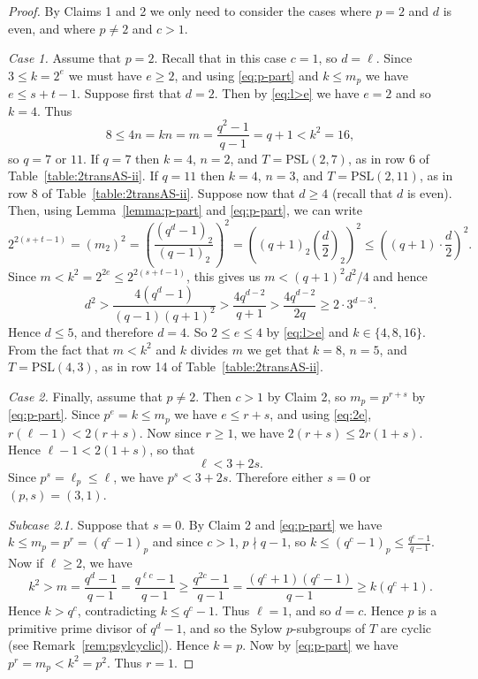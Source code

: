 \documentclass[12pt]{amsart}
\theoremstyle{remark}
\theoremstyle{definition}
\newcommand{\PSL}{\mathrm{PSL}}
\begin{document}
\begin{proof}
\smallskip
By Claims 1 and 2 we only need to consider the cases where $p = 2$ and $d$ is even, and where $p \neq 2$ and $c > 1$.

\emph{Case 1.}  Assume that $p = 2$. Recall that in this case $c = 1$, so $d = \ell$.
 Since $3 \leqslant k = 2^e$ we must have $e \geqslant 2$, and using \eqref{eq:p-part} and $k \leqslant m_p$ we have $e \leqslant s+t-1$.
Suppose first that $d = 2$. Then by \eqref{eq:l>e} we have $e=2$ and so  $k = 4$. Thus
	\[ 
	8 \leqslant 4n = kn = m = \frac{q^2-1}{q-1} = q+1 < k^2 = 16, 
	\]
so $q = 7$ or $11$. If $q = 7$ then $k = 4$, $n = 2$, and $T = \PSL(2,7)$, as in row 6 of Table~\ref{table:2transAS-ii}. If $q = 11$ then $k = 4$, $n = 3$, and $T = \PSL(2,11)$, as in row 8 of Table~\ref{table:2transAS-ii}.
Suppose now that $d \geqslant 4$ (recall that $d$ is even). Then, using Lemma~\ref{lemma:p-part} and \eqref{eq:p-part}, we can write
$$ 
2^{2(s+t-1)}  = (m_2)^2 = \left ( \frac{(q^d-1)_2}{(q-1)_2}\right) ^2 = \left((q+1)_2\left(\frac{d}{2}\right)_2\right)^2 \leqslant \left((q+1) \cdot \frac{d}{2}\right)^2. 
$$
Since $m < k^2 = 2^{2e} \leqslant 2^{2(s+t-1)}$, this gives us $m < (q+1)^2d^2/4$ and hence
	\[ 
	d^2> \frac{4(q^d-1)}{(q-1)(q+1)^2} > \frac{4q^{d-2}}{q+1} > \frac{4q^{d-2}}{2q} \geqslant 2 \cdot 3^{d-3}. 
	\]
Hence $d \leqslant 5$, and therefore $d = 4$. So $2 \leqslant e \leqslant 4$  by \eqref{eq:l>e} and $k \in \{4,8,16\}$. From the fact that $m < k^2$ and $k$ divides $m$ we get that $k = 8$, $n = 5$, and $T = \PSL(4,3)$, as in row 14 of Table~\ref{table:2transAS-ii}.

\emph{Case 2.} Finally, assume that $p \neq 2$. Then $c > 1$ by Claim 2, so $m_p = p^{r+s}$ by \eqref{eq:p-part}. Since $p^e = k \leqslant m_p$ we have $e \leqslant r+s$, and using \eqref{eq:2e}, $r(\ell-1) < 2(r+s)$. Now  since $r \geqslant 1$, we have $2(r+s) \leqslant 2r(1+s)$. Hence $\ell-1 < 2(1+s)$, so that
	\begin{equation} \label{eq:l}
	\ell < 3 + 2s.
	\end{equation}
Since $p^s = \ell_p \leqslant \ell$, we have $p^s < 3 + 2s$.  
Therefore either $s=0$ or $(p,s)=(3,1)$.  

\emph{Subcase 2.1.} Suppose that $s = 0$.  By Claim 2 and  \eqref{eq:p-part} we have $k\leqslant m_p = p^r = (q^c-1)_p$ and since $c>1$, $p \nmid q-1$, so $k\leqslant (q^c-1)_p \leqslant \frac{q^c-1}{q-1}$. Now if $\ell \geqslant 2$, we have 
$$k^2 > m = \frac{q^d-1}{q-1}=\frac{q^{\ell c}-1}{q-1} \geqslant \frac{q^{2c}-1}{q-1} = \frac{(q^c+1)(q^c-1)}{q-1} \geqslant k(q^c+1).$$
 Hence $k > q^c$, contradicting $k \leqslant q^c-1$. Thus $\ell=1$, and so $d=c$. Hence $p$ is a primitive prime divisor of $q^d-1$, and so the Sylow $p$-subgroups of $T$ are cyclic (see Remark~\ref{rem:psylcyclic}). Hence  $k=p$. Now by \eqref{eq:p-part} we have $p^r = m_p < k^2 = p^2$. Thus $r=1$.
 

\end{proof}
\end{document}
